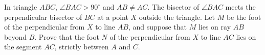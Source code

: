 In triangle $ABC$, $\angle BAC>90^\circ$ and $AB\ne AC$. The bisector of $\angle BAC$ meets the perpendicular bisector of $BC$ at a point $X$ outside the triangle. Let $M$ be the foot of the perpendicular from $X$ to line $AB$, and suppose that $M$ lies on ray $AB$ beyond $B$. Prove that the foot $N$ of the perpendicular from $X$ to line $AC$ lies on the segment $AC$, strictly between $A$ and $C$.
